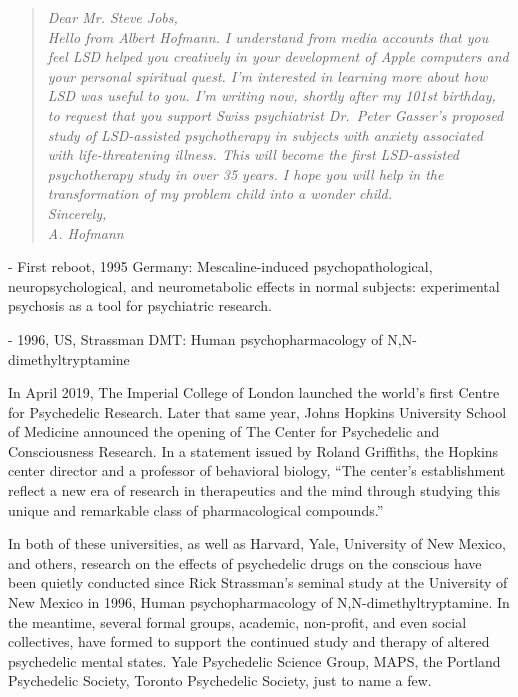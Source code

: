 \documentclass{UIdahoMastersThesis}
\begin{document}
\begin{quote}
\textit{{Dear Mr. Steve Jobs,\\
Hello from Albert Hofmann. I understand from media accounts that you feel LSD helped you creatively in your development of Apple computers and your personal spiritual quest. I'm interested in learning more about how LSD was useful to you.
I'm writing now, shortly after my 101st birthday, to request that you support Swiss psychiatrist Dr.~Peter Gasser's proposed study of LSD-assisted psychotherapy in subjects with anxiety associated with life-threatening illness. This will become the first LSD-assisted psychotherapy study in over 35 years.
I hope you will help in the transformation of my problem child into a wonder child.\\
Sincerely,\\
A. Hofmann}}
\end{quote}

\begin{snugshade*}
- First reboot, 1995 Germany:
Mescaline-induced psychopathological, neuropsychological, and neurometabolic effects in normal subjects: experimental psychosis as a tool for psychiatric research.
\end{snugshade*}

\begin{snugshade*}
- 1996, US, Strassman DMT:
Human psychopharmacology of N,N-dimethyltryptamine
\end{snugshade*}



In April 2019, The Imperial College of London launched the world's first Centre for Psychedelic Research. Later that same year, Johns Hopkins University School of Medicine announced the opening of The Center for Psychedelic and Consciousness Research. In a statement issued by Roland Griffiths, the Hopkins center director and a professor of behavioral biology, \enquote{The center's establishment reflect a new era of research in therapeutics and the mind through studying this unique and remarkable class of pharmacological compounds.}

In both of these universities, as well as Harvard, Yale, University of New Mexico, and others, research on the effects of psychedelic drugs on the conscious have been quietly conducted since Rick Strassman's seminal study at the University of New Mexico in 1996, Human psychopharmacology of N,N-dimethyltryptamine. In the meantime, several formal groups, academic, non-profit, and even social collectives, have formed to support the continued study and therapy of altered psychedelic mental states.  Yale Psychedelic Science Group, \ac{MAPS}, the Portland Psychedelic Society, Toronto Psychedelic Society, just to name a few.
\end{document}
